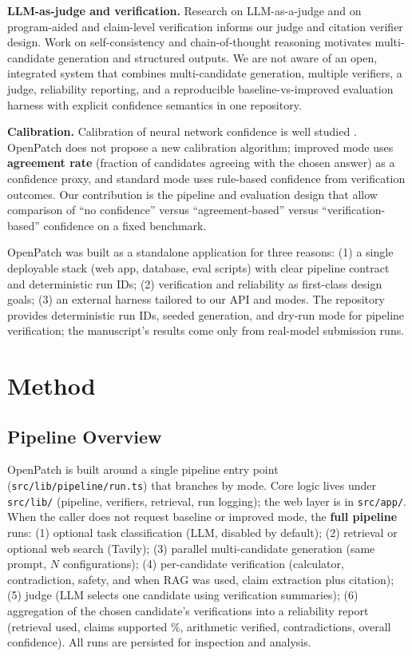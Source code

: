 \documentclass[10pt]{article}
\begin{document}
\textbf{LLM-as-judge and verification.} Research on LLM-as-a-judge \citep{zheng2023judging} and on program-aided and claim-level verification \citep{gao2023pal} informs our judge and citation verifier design. Work on self-consistency \citep{wang2023selfconsistency} and chain-of-thought reasoning \citep{wei2022cot} motivates multi-candidate generation and structured outputs. We are not aware of an open, integrated system that combines multi-candidate generation, multiple verifiers, a judge, reliability reporting, and a reproducible baseline-vs-improved evaluation harness with explicit confidence semantics in one repository.

\textbf{Calibration.} Calibration of neural network confidence is well studied \citep{guo2017calibration}. OpenPatch does not propose a new calibration algorithm; improved mode uses \textbf{agreement rate} (fraction of candidates agreeing with the chosen answer) as a confidence proxy, and standard mode uses rule-based confidence from verification outcomes. Our contribution is the pipeline and evaluation design that allow comparison of ``no confidence'' versus ``agreement-based'' versus ``verification-based'' confidence on a fixed benchmark.

OpenPatch was built as a standalone application for three reasons: (1) a single deployable stack (web app, database, eval scripts) with clear pipeline contract and deterministic run IDs; (2) verification and reliability as first-class design goals; (3) an external harness tailored to our API and modes. The repository provides deterministic run IDs, seeded generation, and dry-run mode for pipeline verification; the manuscript's results come only from real-model submission runs.

\section{Method}
\label{sec:method}

\subsection{Pipeline Overview}
OpenPatch is built around a single pipeline entry point (\texttt{src/lib/pipeline/run.ts}) that branches by mode. Core logic lives under \texttt{src/lib/} (pipeline, verifiers, retrieval, run logging); the web layer is in \texttt{src/app/}. When the caller does not request baseline or improved mode, the \textbf{full pipeline} runs: (1) optional task classification (LLM, disabled by default); (2) retrieval or optional web search (Tavily); (3) parallel multi-candidate generation (same prompt, $N$ configurations); (4) per-candidate verification (calculator, contradiction, safety, and when RAG was used, claim extraction plus citation); (5) judge (LLM selects one candidate using verification summaries); (6) aggregation of the chosen candidate's verifications into a reliability report (retrieval used, claims supported \%, arithmetic verified, contradictions, overall confidence). All runs are persisted for inspection and analysis.
\end{document}
